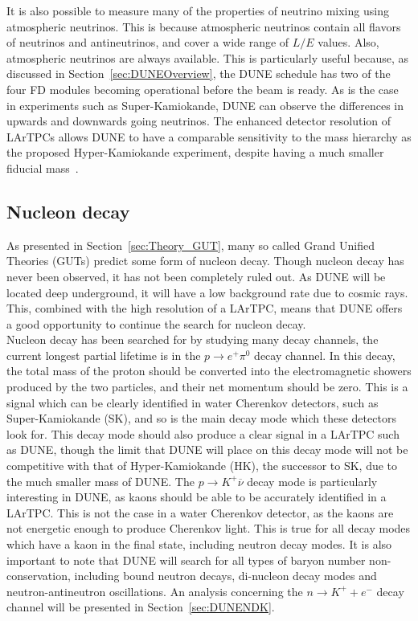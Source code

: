 It is also possible to measure many of the properties of neutrino mixing using atmospheric neutrinos. This is because atmospheric neutrinos contain all flavors of neutrinos and antineutrinos, and cover a wide range of $L/E$ values. Also, atmospheric neutrinos are always available. This is particularly useful because, as discussed in Section~\ref{sec:DUNEOverview}, the DUNE schedule has two of the four FD modules becoming operational before the beam is ready. As is the case in experiments such as Super-Kamiokande, DUNE can observe the differences in upwards and downwards going neutrinos. The enhanced detector resolution of LArTPCs allows DUNE to have a comparable sensitivity to the mass hierarchy as the proposed Hyper-Kamiokande experiment, despite having a much smaller fiducial mass~\citep{DUNECDR_V2}.  

\subsection{Nucleon decay} \label{sec:DUNE_NDK}%
As presented in Section~\ref{sec:Theory_GUT}, many so called Grand Unified Theories (GUTs) predict some form of nucleon decay. Though nucleon decay has never been observed, it has not been completely ruled out. As DUNE will be located deep underground, it will have a low background rate due to cosmic rays. This, combined with the high resolution of a LArTPC, means that DUNE offers a good opportunity to continue the search for nucleon decay. \\

Nucleon decay has been searched for by studying many decay channels, the current longest partial lifetime is in the $p \rightarrow e^{+} \pi^{0}$ decay channel. In this decay, the total mass of the proton should be converted into the electromagnetic showers produced by the two particles, and their net momentum should be zero. This is a signal which can be clearly identified in water Cherenkov detectors, such as Super-Kamiokande (SK), and so is the main decay mode which these detectors look for. This decay mode should also produce a clear signal in a LArTPC such as DUNE, though the limit that DUNE will place on this decay mode will not be competitive with that of Hyper-Kamiokande (HK), the successor to SK, due to the much smaller mass of DUNE. The $p \rightarrow K^{+} \overline{\nu}$ decay mode is particularly interesting in DUNE, as kaons should be able to be accurately identified in a LArTPC. This is not the case in a water Cherenkov detector, as the kaons are not energetic enough to produce Cherenkov light. This is true for all decay modes which have a kaon in the final state, including neutron decay modes. It is also important to note that DUNE will search for all types of baryon number non-conservation, including bound neutron decays, di-nucleon decay modes and neutron-antineutron oscillations. An analysis concerning the $n \rightarrow K^{+} + e^{-}$ decay channel will be presented in Section~\ref{sec:DUNENDK}. \\

